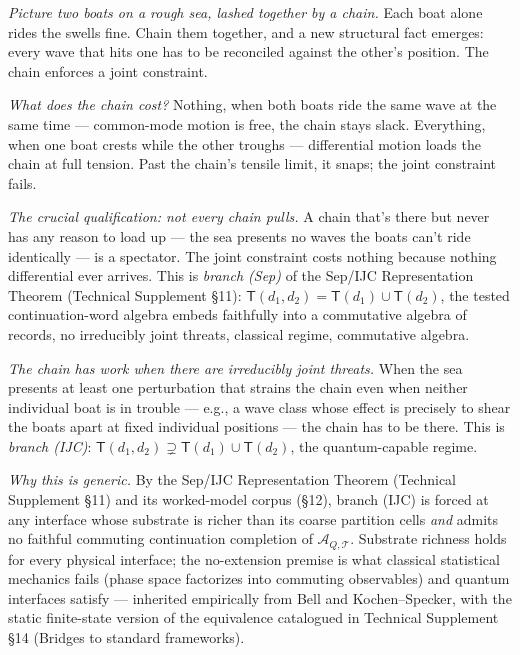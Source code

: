 \documentclass[11pt]{article}
\theoremstyle{remark}
\begin{document}
\begin{tcolorbox}[apfbox, title={Physical intuition: the chained boats and the IJC dichotomy}]
\footnotesize
\textit{Picture two boats on a rough sea, lashed together by a chain.}  Each boat alone rides the swells fine.  Chain them together, and a new structural fact emerges: every wave that hits one has to be reconciled against the other's position.  The chain enforces a joint constraint.

\smallskip\noindent\textit{What does the chain cost?}  Nothing, when both boats ride the same wave at the same time --- common-mode motion is free, the chain stays slack.  Everything, when one boat crests while the other troughs --- differential motion loads the chain at full tension.  Past the chain's tensile limit, it snaps; the joint constraint fails.

\smallskip\noindent\textit{The crucial qualification: not every chain pulls.}  A chain that's there but never has any reason to load up --- the sea presents no waves the boats can't ride identically --- is a spectator.  The joint constraint costs nothing because nothing differential ever arrives.  This is \emph{branch (Sep)} of the Sep/IJC Representation Theorem (Technical Supplement \S11): $\mathsf{T}(d_1, d_2) = \mathsf{T}(d_1) \cup \mathsf{T}(d_2)$, the tested continuation-word algebra embeds faithfully into a commutative algebra of records, no irreducibly joint threats, classical regime, commutative algebra.

\smallskip\noindent\textit{The chain has work when there are irreducibly joint threats.}  When the sea presents at least one perturbation that strains the chain even when neither individual boat is in trouble --- e.g., a wave class whose effect is precisely to shear the boats apart at fixed individual positions --- the chain has to be there.  This is \emph{branch (IJC)}: $\mathsf{T}(d_1, d_2) \supsetneq \mathsf{T}(d_1) \cup \mathsf{T}(d_2)$, the quantum-capable regime.

\smallskip\noindent\textit{Why this is generic.}  By the Sep/IJC Representation Theorem (Technical Supplement \S11) and its worked-model corpus (\S12), branch (IJC) is forced at any interface whose substrate is richer than its coarse partition cells \emph{and} admits no faithful commuting continuation completion of $\mathcal{A}_{Q,\mathcal{T}}$.  Substrate richness holds for every physical interface; the no-extension premise is what classical statistical mechanics fails (phase space factorizes into commuting observables) and quantum interfaces satisfy --- inherited empirically from Bell and Kochen--Specker, with the static finite-state version of the equivalence catalogued in Technical Supplement \S14 (Bridges to standard frameworks).


\end{tcolorbox}
\end{document}
